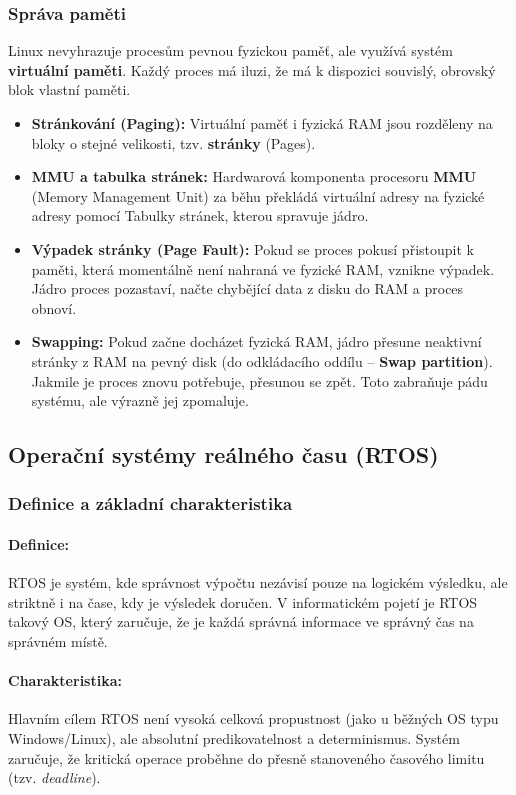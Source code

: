 \subsubsection*{Správa paměti}
Linux nevyhrazuje procesům pevnou fyzickou paměť, ale využívá systém \textbf{virtuální paměti}. Každý proces má iluzi, že má k dispozici souvislý, obrovský blok vlastní paměti.
\begin{itemize}
    \item \textbf{Stránkování (Paging):} Virtuální paměť i fyzická RAM jsou rozděleny na bloky o stejné velikosti, tzv. \textbf{stránky} (Pages). 
    \item \textbf{MMU a tabulka stránek:} Hardwarová komponenta procesoru \textbf{MMU} (Memory Management Unit) za běhu překládá virtuální adresy na fyzické adresy pomocí Tabulky stránek, kterou spravuje jádro.
    \item \textbf{Výpadek stránky (Page Fault):} Pokud se proces pokusí přistoupit k paměti, která momentálně není nahraná ve fyzické RAM, vznikne výpadek. Jádro proces pozastaví, načte chybějící data z disku do RAM a proces obnoví.
    \item \textbf{Swapping:} Pokud začne docházet fyzická RAM, jádro přesune neaktivní stránky z RAM na pevný disk (do odkládacího oddílu – \textbf{Swap partition}). Jakmile je proces znovu potřebuje, přesunou se zpět. Toto zabraňuje pádu systému, ale výrazně jej zpomaluje.
\end{itemize}

\subsection{Operační systémy reálného času (RTOS)}

\subsubsection*{Definice a základní charakteristika}
\paragraph*{Definice:} RTOS je systém, kde správnost výpočtu nezávisí pouze na logickém výsledku, ale striktně i na čase, kdy je výsledek doručen.
V informatickém pojetí je RTOS
takový OS, který zaručuje, že je
každá správná informace ve správný
čas na správném místě.
\paragraph*{Charakteristika:} Hlavním cílem RTOS není vysoká celková propustnost (jako u běžných OS typu Windows/Linux), ale absolutní predikovatelnost a determinismus. Systém zaručuje, že kritická operace proběhne do přesně stanoveného časového limitu (tzv. \textit{deadline}).

